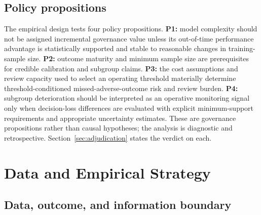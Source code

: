 \documentclass[10pt]{article}
\begin{document}
\subsection{Policy propositions}

The empirical design tests four policy propositions. \textbf{P1:} model complexity should not be assigned incremental governance value unless its out-of-time performance advantage is statistically supported and stable to reasonable changes in training-sample size. \textbf{P2:} outcome maturity and minimum sample size are prerequisites for credible calibration and subgroup claims. \textbf{P3:} the cost assumptions and review capacity used to select an operating threshold materially determine threshold-conditioned missed-adverse-outcome risk and review burden. \textbf{P4:} subgroup deterioration should be interpreted as an operative monitoring signal only when decision-loss differences are evaluated with explicit minimum-support requirements and appropriate uncertainty estimates. These are governance propositions rather than causal hypotheses; the analysis is diagnostic and retrospective. Section~\ref{sec:adjudication} states the verdict on each.

\section{Data and Empirical Strategy}

\subsection{Data, outcome, and information boundary}
\end{document}
